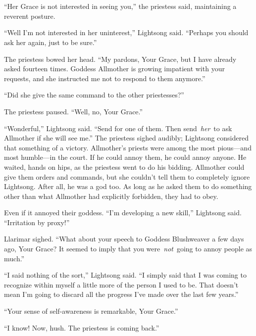 \chapter{}

“Her Grace is not interested in seeing you,” the priestess said, maintaining a reverent posture.

“Well I’m not interested in her uninterest,” Lightsong said. “Perhaps you should ask her again, just to be sure.”

The priestess bowed her head. “My pardons, Your Grace, but I have already asked fourteen times. Goddess Allmother is growing impatient with your requests, and she instructed me not to respond to them anymore.”

“Did she give the same command to the other priestesses?”

The priestess paused. “Well, no, Your Grace.”

“Wonderful,” Lightsong said. “Send for one of them. Then send~\textit{her}~to ask Allmother if she will see me.” The priestess sighed audibly; Lightsong considered that something of a victory. Allmother’s priests were among the most pious—and most humble—in the court. If he could annoy them, he could annoy anyone. He waited, hands on hips, as the priestess went to do his bidding. Allmother could give them orders and commands, but she couldn’t tell them to completely ignore Lightsong. After all, he was a god too. As long as he asked them to do something other than what Allmother had explicitly forbidden, they had to obey.

Even if it annoyed their goddess. “I’m developing a new skill,” Lightsong said. “Irritation by proxy!”

Llarimar sighed. “What about your speech to Goddess Blushweaver a few days ago, Your Grace? It seemed to imply that you were~\textit{not}~going to annoy people as much.”

“I said nothing of the sort,” Lightsong said. “I simply said that I was coming to recognize within myself a little more of the person I used to be. That doesn’t mean I’m going to discard all the progress I’ve made over the last few years.”

“Your sense of self-awareness is remarkable, Your Grace.”

“I know! Now, hush. The priestess is coming back.”

